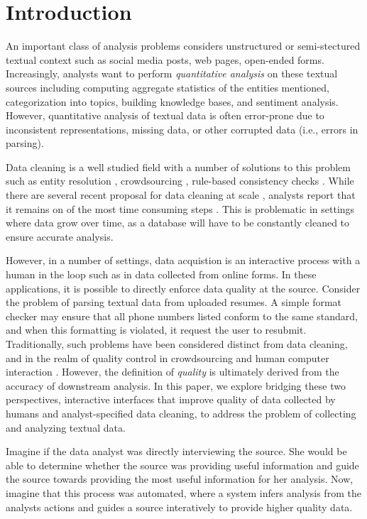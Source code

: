 \section{Introduction}
An important class of analysis problems considers unstructured or semi-stectured textual context such as social media posts, web pages, open-ended forms.
Increasingly, analysts want to perform \emph{quantitative analysis} on these textual sources including computing aggregate statistics of the entities mentioned, categorization into topics, building knowledge bases, and sentiment analysis.
However, quantitative analysis of textual data is often error-prone due to inconsistent representations, missing data, or other corrupted data (i.e., errors in parsing).

Data cleaning is a well studied field with a number of solutions to this problem such as entity resolution \cite{rahm2000data}, crowdsourcing \cite{park2014crowdfill}, rule-based consistency checks \cite{khayyat2015bigdansing}.  
While there are several recent proposal for data cleaning at scale \cite{sampleclean, khayyat2015bigdansing, chu2015katara}, analysts report that it remains on of the most time consuming steps \cite{nytimes}.
This is problematic in settings where data grow over time, as a database will have to be constantly cleaned to ensure accurate analysis.

However, in a number of settings, data acquistion is an interactive process with a human in the loop such as in data collected from online forms.
In these applications, it is possible to directly enforce data quality at the source.
Consider the problem of parsing textual data from uploaded resumes.
A simple format checker may ensure that all phone numbers listed conform to the same standard, and when this formatting is violated, it request the user to resubmit.
Traditionally, such problems have been considered distinct from data cleaning, and in the realm of quality control in crowdsourcing and human computer interaction \cite{franklin2011crowddb,chen2011usher}.
However, the definition of \emph{quality} is ultimately derived from the accuracy of downstream analysis.
In this paper, we explore bridging these two perspectives, interactive interfaces that improve quality of data collected by humans and analyst-specified data cleaning, to address the problem of collecting and analyzing textual data.  

Imagine if the data analyst was directly interviewing the source.
She would be able to determine whether the source was providing useful information and guide the source towards providing the most useful information for her analysis.
Now, imagine that this process was automated, where a system infers analysis from the analysts actions and guides a source interatively to provide higher quality data. 

